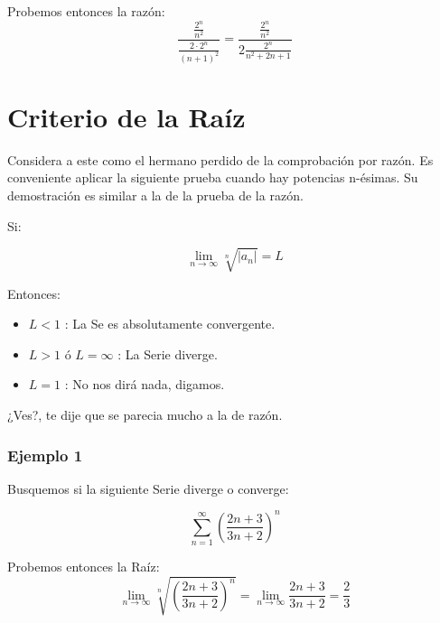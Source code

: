 \documentclass[12pt]{report}                                %
\begin{document}
            Probemos entonces la razón:
            \begin{equation*}
                \frac{ \frac{2^n}{n^2} }{ \frac{2 \cdot 2^n}{(n+1)^2 } } = \frac{ \frac{2^n}{n^2} }{ 2 \frac{2^n}{n^2 + 2n + 1} }
            \end{equation*}


    \clearpage
    \section{Criterio de la Raíz}

        Considera a este como el hermano perdido de la comprobación por razón.
        Es conveniente aplicar la siguiente prueba cuando hay potencias n-ésimas.
        Su demostración es similar a la de la prueba de la razón. 

        Si:

        \begin{equation}
            \lim_{n \to \infty} \sqrt[n]{|a_n|} = L
        \end{equation}

        Entonces:
        \begin{itemize}
            \item $L < 1$ : La Se es absolutamente convergente.
            \item $L > 1$ ó $L = \infty$ : La Serie diverge.
            \item $L = 1$ : No nos dirá nada, digamos.
        \end{itemize}

        ¿Ves?, te dije que se parecia mucho a la de razón.

        \subsubsection{Ejemplo 1}
            Busquemos si la siguiente Serie diverge o converge:

            \begin{equation*}
                \sum_{n=1}^{\infty} \left( \frac{2n+3}{3n+2} \right)^n
            \end{equation*}

            Probemos entonces la Raíz:
            \begin{equation*}
                 \lim_{n \to \infty} \sqrt[n]{ \left( \frac{2n+3}{3n+2} \right)^n } =
                 \lim_{n \to \infty} \frac{2n+3}{3n+2} = \frac{2}{3}
            \end{equation*}
\end{document}
